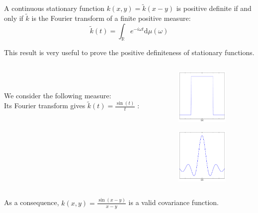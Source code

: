 
\begin{frame}{}
\begin{theorem}[Bochner]
A continuous stationary function $k(x,y)=\tilde{k}(x-y)$ is positive definite if and only if $\tilde{k}$ is the Fourier transform of a finite positive measure:
\begin{equation*}
\tilde{k}(t) = \int_\mathds{R} e^{-i \omega t} \mathrm{d} \mu(\omega)
\end{equation*}
\end{theorem}
\vspace{5mm}
This result is very useful to prove the positive definiteness of stationary functions.
\end{frame}

\begin{frame}{}
\begin{example}
\begin{columns}[c]
\begin{column}{7cm}
\ \\ \  \\
We consider the following measure:\\
\vspace{2.3cm}
Its Fourier transform gives $\tilde{k}(t) = \displaystyle \frac{\sin(t)}{t}$ :
\end{column}
\begin{column}{5cm}
\begin{center}
\includegraphics[width=2.5cm]{3_gaussian_process_regression/figures/python/Bochner-musinc}
\end{center}

\begin{center}
\includegraphics[width=2.5cm]{3_gaussian_process_regression/figures/python/Bochner-ksinc}
\end{center}
\end{column}
\end{columns}
\vspace{2mm}
As a consequence, $\displaystyle k(x,y) = \frac{\sin(x-y)}{x-y}$
is a valid covariance function.
\end{example}

\end{frame}

